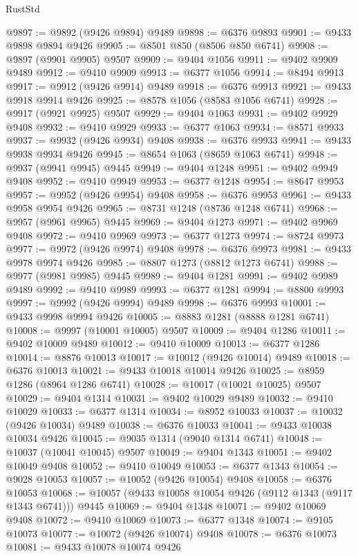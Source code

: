 \begin{lexlean}{RustStd}
\begin{coremodule}
@9897 := @9892 (@9426 @9894) @9489
@9898 := @6376 @9893
@9901 := @9433 @9898 @9894 @9426
@9905 := @8501 @850 (@8506 @850 @6741)
@9908 := @9897 (@9901 @9905) @9507
@9909 := @9404 @1056
@9911 := @9402 @9909 @9489
@9912 := @9410 @9909
@9913 := @6377 @1056
@9914 := @8494 @9913
@9917 := @9912 (@9426 @9914) @9489
@9918 := @6376 @9913
@9921 := @9433 @9918 @9914 @9426
@9925 := @8578 @1056 (@8583 @1056 @6741)
@9928 := @9917 (@9921 @9925) @9507
@9929 := @9404 @1063
@9931 := @9402 @9929 @9408
@9932 := @9410 @9929
@9933 := @6377 @1063
@9934 := @8571 @9933
@9937 := @9932 (@9426 @9934) @9408
@9938 := @6376 @9933
@9941 := @9433 @9938 @9934 @9426
@9945 := @8654 @1063 (@8659 @1063 @6741)
@9948 := @9937 (@9941 @9945) @9445
@9949 := @9404 @1248
@9951 := @9402 @9949 @9408
@9952 := @9410 @9949
@9953 := @6377 @1248
@9954 := @8647 @9953
@9957 := @9952 (@9426 @9954) @9408
@9958 := @6376 @9953
@9961 := @9433 @9958 @9954 @9426
@9965 := @8731 @1248 (@8736 @1248 @6741)
@9968 := @9957 (@9961 @9965) @9445
@9969 := @9404 @1273
@9971 := @9402 @9969 @9408
@9972 := @9410 @9969
@9973 := @6377 @1273
@9974 := @8724 @9973
@9977 := @9972 (@9426 @9974) @9408
@9978 := @6376 @9973
@9981 := @9433 @9978 @9974 @9426
@9985 := @8807 @1273 (@8812 @1273 @6741)
@9988 := @9977 (@9981 @9985) @9445
@9989 := @9404 @1281
@9991 := @9402 @9989 @9489
@9992 := @9410 @9989
@9993 := @6377 @1281
@9994 := @8800 @9993
@9997 := @9992 (@9426 @9994) @9489
@9998 := @6376 @9993
@10001 := @9433 @9998 @9994 @9426
@10005 := @8883 @1281 (@8888 @1281 @6741)
@10008 := @9997 (@10001 @10005) @9507
@10009 := @9404 @1286
@10011 := @9402 @10009 @9489
@10012 := @9410 @10009
@10013 := @6377 @1286
@10014 := @8876 @10013
@10017 := @10012 (@9426 @10014) @9489
@10018 := @6376 @10013
@10021 := @9433 @10018 @10014 @9426
@10025 := @8959 @1286 (@8964 @1286 @6741)
@10028 := @10017 (@10021 @10025) @9507
@10029 := @9404 @1314
@10031 := @9402 @10029 @9489
@10032 := @9410 @10029
@10033 := @6377 @1314
@10034 := @8952 @10033
@10037 := @10032 (@9426 @10034) @9489
@10038 := @6376 @10033
@10041 := @9433 @10038 @10034 @9426
@10045 := @9035 @1314 (@9040 @1314 @6741)
@10048 := @10037 (@10041 @10045) @9507
@10049 := @9404 @1343
@10051 := @9402 @10049 @9408
@10052 := @9410 @10049
@10053 := @6377 @1343
@10054 := @9028 @10053
@10057 := @10052 (@9426 @10054) @9408
@10058 := @6376 @10053
@10068 := @10057 (@9433 @10058 @10054 @9426 (@9112 @1343 (@9117 @1343 @6741))) @9445
@10069 := @9404 @1348
@10071 := @9402 @10069 @9408
@10072 := @9410 @10069
@10073 := @6377 @1348
@10074 := @9105 @10073
@10077 := @10072 (@9426 @10074) @9408
@10078 := @6376 @10073
@10081 := @9433 @10078 @10074 @9426

\end{coremodule}
\end{lexlean}
